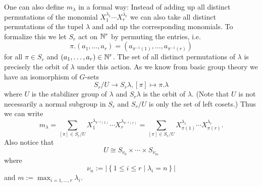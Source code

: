 One can also define $m_\lambda$ in a formal way: Instead of adding up all distinct permutations of the monomial $X_1^{\lambda_1} \dotsm X_r^{\lambda_r}$ we can also take all distinct permutations of the tupel $\lambda$ and add up the corresponding monomials. To formalize this we let $S_r$ act on $\mathbb{N}^r$ by permuting the entries, i.e.
\[
 \pi.(a_1, \dotsc, a_r) = \left( a_{\pi^{-1}(1)}, \dotsc, a_{\pi^{-1}(r)} \right)
\]
for all $\pi \in S_r$ and $(a_1, \dotsc, a_r) \in \mathbb{N}^r$. The set of all distinct permutations of $\lambda$ is precisely the orbit of $\lambda$ under this action. As we know from basic group theory we have an isomorphism of $G$-sets
\[
 S_r / U \to S_r \lambda, [\pi] \mapsto \pi.\lambda
\]
where $U$ is the stabilizer group of $\lambda$ and $S_r \lambda$ is the orbit of $\lambda$. (Note that $U$ is not necessarily a normal subgroup in $S_r$ and $S_r/U$ is only the set of left cosets.) Thus we can write
\[
 m_\lambda
 = \sum_{[\pi] \in S_r/U} X_1^{\lambda_{\pi^{-1}(1)}} \dotsm X_r^{\lambda_{\pi^{-1}(r)}}
 = \sum_{[\pi] \in S_r/U} X_{\pi(1)}^{\lambda_1} \dotsm X_{\pi(r)}^{\lambda_r}.
\]
Also notice that
\[
 U \cong S_{\nu_0} \times \dotsb \times S_{\nu_m}
\]
where
\[
 \nu_n := \left|\left\{ 1 \leq i \leq r \mid \lambda_i = n \right\}\right|
\]
and $m := \max_{i=1,\dotsc,r} \lambda_i$.


\begin{expl}
\end{expl}


